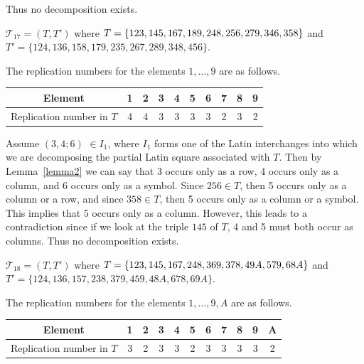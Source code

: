 \documentclass[12pt]{report}
\begin{document}
Thus no decomposition exists.
\vspace{0.5cm}

 ${\mathcal T}_{17}=(T,T')$ 
where $T=\{1 2 3,1 4 5,1 6 7,1 8 9,2 4 8,2 5 6,2 7 9,
3 4 6,\break 3 5 8\}$ and
$T'=\{1 2 4,1 3 6,1 5 8,1 7 9,2 3 5,2 6 7,2 8 9,3 4 8,4 5 6 \}$.

The replication numbers for the elements $1,\dots, 9$ are as follows. 

\begin{center}
\begin{tabular}{c|c|c|c|c|c|c|c|c|c}
Element              & 1 & 2 & 3 & 4 & 5 & 6 & 7 & 8 & 9 \\
			  \hline
 Replication  number in $T$ & 4 & 4 & 3 & 3 & 3 & 3 & 2 & 3 & 2
\end{tabular}
\end{center}

Assume $(3, 4; 6)$ $\in I_1$, where $I_1$ forms one of the Latin interchanges
into which we are decomposing the partial Latin square associated 
with $T$.  Then 
by Lemma~\ref{lemma2} we can say that 3 occurs only as a row, 4 occurs only
as a column, and 6 occurs only as a symbol.  Since $256 \in T$, 
then 5 occurs only as a column or a row, and since $358 \in T$,
then 5 occurs only as a column or a symbol.  This implies that
5 occurs only as a column.  However, this leads to a contradiction
since if we look at the triple $145$ of $T$, 4 and 5 must both occur
as columns.  Thus no decomposition exists. 
\vspace{0.5cm}

 ${\mathcal T}_{18}=(T,T')$ 
where $T=\{1 2 3,1 4 5,1 6 7,2 4 8,3 6 9,3 7 8,4 9 A,
5 7 9,\break 6 8 A\}$ and
$T'=\{1 2 4,1 3 6,1 5 7,2 3 8,3 7 9,4 5 9,4 8 A,6 7 8,6 9 A \}$.

The replication numbers for the elements $1,\dots, 9, A$ are as follows.

\begin{center}
\begin{tabular}{c|c|c|c|c|c|c|c|c|c|c}
Element              & 1 & 2 & 3 & 4 & 5 & 6 & 7 & 8 & 9 & A \\
			  \hline
 Replication  number in $T$ & 3 & 2 & 3 & 3 & 2 & 3 & 3 & 3 & 3 & 2
\end{tabular}
\end{center}
\end{document}

